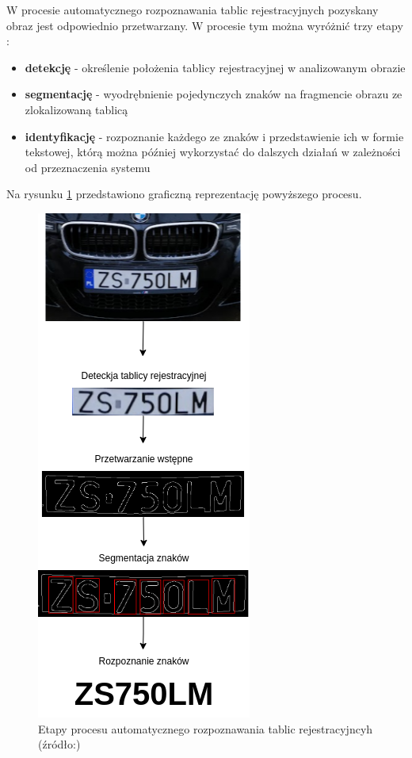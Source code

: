 W procesie automatycznego rozpoznawania tablic rejestracyjnych pozyskany obraz jest odpowiednio przetwarzany.
W procesie tym można wyróżnić trzy etapy \cite{1688109}:
\begin{itemize}
    \item \textbf{detekcję} - określenie położenia tablicy rejestracyjnej w analizowanym obrazie
    \item \textbf{segmentację} - wyodrębnienie pojedynczych znaków na fragmencie obrazu ze zlokalizowaną tablicą
    \item \textbf{identyfikację} - rozpoznanie każdego ze znaków i przedstawienie ich w formie tekstowej, którą można później wykorzystać do dalszych działań w zależności od przeznaczenia systemu
\end{itemize}

Na rysunku \ref{fig:schemat_lpr} przedstawiono graficzną reprezentację powyższego procesu.

\begin{figure}[!ht]
    \centering
    \includegraphics[scale=0.6]{Pictures/schemat_lpr.png}
    \caption{Etapy procesu automatycznego rozpoznawania tablic rejestracyjncyh (źródło:)}
    \label{fig:schemat_lpr}
\end{figure}


